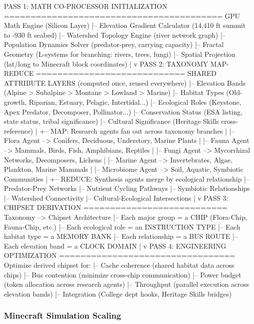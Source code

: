 \documentclass[11pt,letterpaper]{article}
\begin{document}
\begin{asciibox}
PASS 1: MATH CO-PROCESSOR INITIALIZATION
=========================================
  GPU Math Engine (Silicon Layer)
    |-- Elevation Gradient Calculator (14,410 ft summit to -930 ft seabed)
    |-- Watershed Topology Engine (river network graph)
    |-- Population Dynamics Solver (predator-prey, carrying capacity)
    |-- Fractal Geometry (L-systems for branching: rivers, trees, fungi)
    |-- Spatial Projection (lat/long to Minecraft block coordinates)
    |
    v
PASS 2: TAXONOMY MAP-REDUCE
============================
  SHARED ATTRIBUTE LAYERS (computed once, reused everywhere)
    |-- Elevation Bands (Alpine > Subalpine > Montane > Lowland > Marine)
    |-- Habitat Types (Old-growth, Riparian, Estuary, Pelagic, Intertidal...)
    |-- Ecological Roles (Keystone, Apex Predator, Decomposer, Pollinator...)
    |-- Conservation Status (ESA listing, state status, tribal significance)
    |-- Cultural Significance (Heritage Skills cross-reference)
    |
    +-- MAP: Research agents fan out across taxonomy branches
    |     |-- Flora Agent --> Conifers, Deciduous, Understory, Marine Plants
    |     |-- Fauna Agent --> Mammals, Birds, Fish, Amphibians, Reptiles
    |     |-- Fungi Agent --> Mycorrhizal Networks, Decomposers, Lichens
    |     |-- Marine Agent --> Invertebrates, Algae, Plankton, Marine Mammals
    |     |-- Microbiome Agent --> Soil, Aquatic, Symbiotic Communities
    |
    +-- REDUCE: Synthesis agents merge by ecological relationship
          |-- Predator-Prey Networks
          |-- Nutrient Cycling Pathways
          |-- Symbiotic Relationships
          |-- Watershed Connectivity
          |-- Cultural-Ecological Intersections
    |
    v
PASS 3: CHIPSET DERIVATION
===========================
  Taxonomy --> Chipset Architecture
    |-- Each major group = a CHIP (Flora-Chip, Fauna-Chip, etc.)
    |-- Each ecological role = an INSTRUCTION TYPE
    |-- Each habitat type = a MEMORY BANK
    |-- Each relationship = a BUS ROUTE
    |-- Each elevation band = a CLOCK DOMAIN
    |
    v
PASS 4: ENGINEERING OPTIMIZATION
=================================
  Optimize derived chipset for:
    |-- Cache coherence (shared habitat data across chips)
    |-- Bus contention (minimize cross-chip communication)
    |-- Power budget (token allocation across research agents)
    |-- Throughput (parallel execution across elevation bands)
    |-- Integration (College dept hooks, Heritage Skills bridges)
\end{asciibox}

\subsubsection{Minecraft Simulation Scaling}
\end{document}
